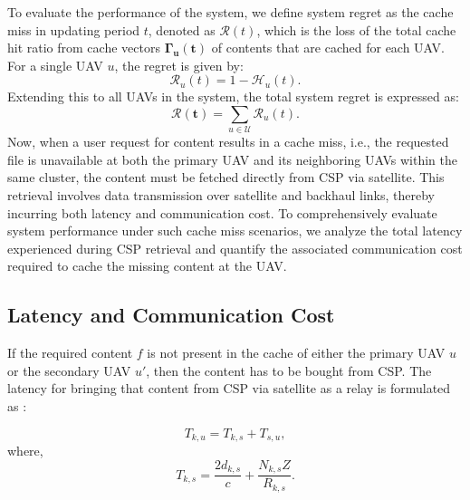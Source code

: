 \documentclass[journal]{IEEEtran}
\begin{document}
To evaluate the performance of the system, we define system regret as the cache miss in updating period \(t\), denoted as \(\mathcal{R}(t)\), which is the loss of the total cache hit ratio from cache vectors 
\(\boldsymbol{\Gamma_{u}(t)}\) of contents that are cached for each UAV. For a single UAV \( u \), the regret is given by:
\begin{equation}
    \mathcal{R}_u(t) = 1 - \mathcal{H}_u(t).
\end{equation}
Extending this to all UAVs in the system, the total system regret is expressed as:
\begin{equation}
    \boldsymbol{\mathcal{R}(t)} = \sum\limits_{u \in \mathcal{U}} \mathcal{R}_u(t).
    \label{systemregretall}
\end{equation}
Now, when a user request for content results in a cache miss, i.e., the requested file is unavailable at both the primary UAV and its neighboring UAVs within the same cluster, the content must be fetched directly from 
CSP via satellite. This retrieval involves data transmission over satellite and backhaul links, thereby incurring both latency and communication cost. To comprehensively evaluate system performance under such cache miss scenarios, we analyze the total latency experienced during CSP retrieval and quantify the associated communication cost required to cache the missing content at the UAV.

\subsection{Latency and Communication Cost}

 If the required content $f$ is not present in the cache of either the primary UAV $u$ or the secondary UAV $u'$, then the content has to be bought from CSP. The latency for bringing that content from CSP via satellite as a relay is formulated as \cite{10667821}:
 
\begin{equation} \label{12}
        T_{k,u} = T_{k,s}+ T_{s,u},
\end{equation}    
where, 
\begin{equation} \label{14}
        T_{k,s} = \frac{2d_{k,s}}{c}  + \frac{N_{k,s}Z}{R_{k,s}}.
\end{equation}
\end{document}
